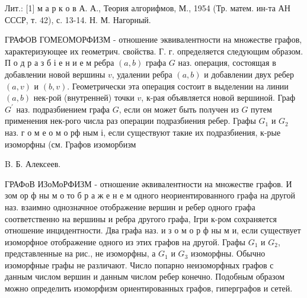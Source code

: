 \documentclass[10pt]{article}
\begin{document}
Лит.: [1] м а р к о в А. А., Теория алгорифмов, М., 1954 (Тр. матем. ин-та АН СССР, т. 42), с. 13-14. Н. М. Нагорный.



ГРАФОВ ГОМЕОМОРФИЗМ - отношение эквивалентности на множестве графов, характеризующее их геометрич. свойства. Г. г. определяется следующим образом. П о д р а з б і е н и е м ребра $(a, b)$ графа $G$ наз. операция, состоящая в добавлении новой вершины $v$, удалении ребра $(a, b)$ и добавлении двух ребер $(a, v)$ и $(b, v)$. Геометрически эта операция состоит в выделении на линии $(a, b)$ нек-рой (внутренней) точки $v$, к-рая объявляется новой вершиной. Граф $G^{\prime}$ наз. подразбиением графа $G$, если он может быть получен из $G$ путем применения нек-рого числа раз операции подразбиения ребер. Графы $G_{1}$ и $G_{2}$ наз. г о м е о м о рф ным і, если существуют такие их подразбиения, к-рые изоморфны (см. Графов изоморбизм



B. Б. Алексеев.



ГРАФоВ ИЗоМоРФИЗМ - отношение әквивалентности на множестве графов. И зом ор ф ны м о то б р а ж е н е м одного неориентированного графа на другой наз. взаимно однозначное отображение вершин и ребер одного графа соответственно на вершины и ребра другого графа, Ігри к-ром сохраняется отношение инцидентности. Два графа наз. и з о м о р ф ны м и, если существует изоморфное отображение одного из этих графов на другой. Графы $G_{1}$ и $G_{2}$, представленные на рис., не изоморфны, а $G_{1}$ и $G_{3}$ изоморфны. Обычно изоморфные графы не различают. Число попарно неизоморфных графов с данным числом вершин и данным числом ребер конечно. Подобным образом можно определить изоморфизм ориентированных графов, гиперграфов и сетей.
\end{document}
